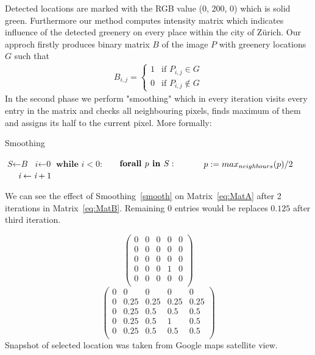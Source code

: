 \documentclass[letterpaper]{article}
\begin{document}
Detected locations are marked with the RGB value (0, 200, 0) which is solid green. Furthermore our method computes intensity matrix which indicates influence
of the detected greenery on every place within the city of Zürich. Our approch firstly produces binary matrix $B$ of the image $P$ with greenery
locations $G$ such that 
\newline
\begin{align*}
B_{i,j} = \begin{cases} 1 & \text{if } P_{i,j} \in G\\
                         0 & \text{if } P_{i,j} \notin G  
\end{cases}
\end{align*}
\newline
In the second phase we perform "smoothing" which in every iteration visits every entry in the matrix and checks all neighbouring pixels, 
finds maximum of them and assigns its half to the current pixel. More formally:

\begin{algorithm}
    \caption{Smoothing}\label{smooth}
    \begin{algorithmic}[1]
    \State $\textit{S} \gets \textit{B}$
    \State $\textit{i} \gets \textit{0}$
    \State $\textbf{while } \textit{i} < 0:$
    \State $\indent \textbf{forall } p \textbf{ in } S:$
    \State $\indent \indent p := max_{neighbours}(p) / 2$
    \State $\indent \textit{i} \gets \textit{i} + 1$
    \EndProcedure
    \end{algorithmic}
    \end{algorithm}
    
We can see the effect of Smoothing~\ref{smooth} on Matrix~\ref{eq:MatA} after 2 iterations
in Matrix~\ref{eq:MatB}. Remaining $0$ entries would be replaces $0.125$ after third iteration.

\begin{equation}
\begin{pmatrix}
    0 & 0 & 0 & 0 & 0 \\
    0 & 0 & 0 & 0 & 0 \\
    0 & 0 & 0 & 0 & 0 \\
    0 & 0 & 0 & 1 & 0 \\
    0 & 0 & 0 & 0 & 0 \\
\end{pmatrix}
\label{eq:MatA}
\end{equation}
\begin{equation}
\begin{pmatrix}
    0 & 0 & 0 & 0 & 0 \\
    0 & 0.25 & 0.25 & 0.25 & 0.25 \\
    0 & 0.25 & 0.5 & 0.5 & 0.5 \\
    0 & 0.25 & 0.5 & 1 & 0.5 \\
    0 & 0.25 & 0.5 & 0.5 & 0.5 \\
\end{pmatrix}
\label{eq:MatB}
\end{equation}
Snapshot of selected location was taken from Google maps satellite view.
\end{document}
